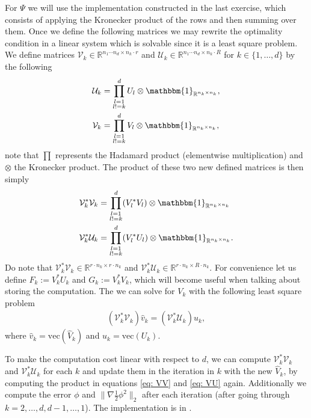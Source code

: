 \documentclass[a4paper]{article}
\begin{document}
For $\Psi$ we will use the implementation constructed in the last exercise,
which consists of applying the Kronecker product of the rows and then
summing over them. Once we define the following matrices we may rewrite the
optimality condition in a linear system which is solvable since it is a least
square problem. We define matrices $\mathcal{V}_k \in \mathbb{R}^{n_1\cdots n_d
\times n_k\cdot r}$ and $\mathcal{U}_k \in \mathbb{R}^{n_1\cdots n_d \times
n_k\cdot R}$ for $k \in \{1, \dots,d\}$  by the following
\begin{align}
    \mathcal{U}_k &= \prod_{\substack{l=1 \\ l!=k}}^{d} U_l \otimes
    \mathbbm{1}_{\mathbb{R}^{n_k\times n_k}},\\
    \mathcal{V}_k &= \prod_{\substack{l=1 \\ l!=k}}^{d} V_l \otimes
    \mathbbm{1}_{\mathbb{R}^{n_k\times n_k}},
\end{align}
note that $\prod$ represents the Hadamard product (elementwise multiplication) and
$\otimes$ the Kronecker product. The product of these two new defined
matrices is then simply
\begin{align}
    \mathcal{V}_k^*\mathcal{V}_k &=  \prod_{\substack{l=1 \\ l!=k}}^{d}
    (V_l^*V_l) \otimes \mathbbm{1}_{\mathbb{R}^{n_k\times n_k}}
    \label{eq: VV}    \\
    \mathcal{V}_k^*\mathcal{U}_k &=  \prod_{\substack{l=1 \\ l!=k}}^{d}
    (V_l^*U_l) \otimes \mathbbm{1}_{\mathbb{R}^{n_k\times n_k}}.\label{eq:
        VU}
\end{align}
Do note that $\mathcal{V}_k^*\mathcal{V}_k \in \mathbb{R}^{r\cdot n_k \times
r\cdot n_k}$ and $\mathcal{V}_k^*\mathcal{U}_k \in \mathbb{R}^{r\cdot n_k
\times R\cdot n_k}$. For convenience let us define $F_k := V_k^* U_k$ and
$G_k := V_k^* V_k$, which will become useful when talking about storing the
computation. The we can solve for $V_k$ with the following least square
problem
\begin{align}
    (\mathcal{V}_k^*\mathcal{V}_k)\hat{v}_k = (\mathcal{V}_k^*\mathcal{U}_k)u_k,
\end{align}
where $\hat{v}_k = \text{vec}(\hat{V}_k)$ and $u_k = \text{vec}(U_k)$.

To make the computation cost linear with respect to $d$, we can compute
$\mathcal{V}_k^*\mathcal{V}_k$ and $\mathcal{V}_k^*\mathcal{U}_k$ for
each $k$ and update them in the iteration in $k$ with the new $\hat{V}_k$, by
computing the product in equations \ref{eq: VV} and \ref{eq: VU} again.
Additionally we compute the error $\phi$ and $\|\nabla \frac{1}{2}
\phi^2\|_2$ after each iteration (after going through
$k=2,\dots,d,d-1,\dots,1$). The implementation is in \cite{code}.
\end{document}
